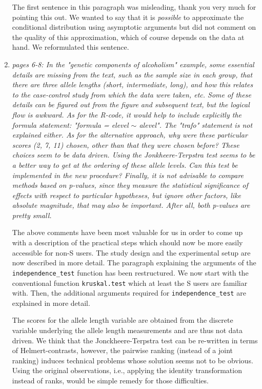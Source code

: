 \documentclass[11pt]{article}
\begin{document}
\begin{enumerate}
The first sentence in this paragraph was misleading, thank you very much for
pointing this out. We wanted to say that it is \textit{possible} to
approximate the conditional distribution using asymptotic arguments but did
not comment on the quality of this approximation, which of course depends on
the data at hand. We reformulated this sentence.

\item \textsl{pages 6-8:  In the "genetic components of alcoholism" example, some essential details are 
              missing from the text, such as the sample size in each group, that there are three allele 
              lengths (short, intermediate, long), and how this relates to the case-control study from 
              which the data were taken, etc. Some of these details can be figured out from the figure 
              and subsequent text, but the logical flow is awkward.  As for the R-code, it would help 
              to include explicitly the formula statement: "formula = elevel $\sim$ alevel". The "trafo" 
              statement is not explained either.  As for the alternative approach, why were these 
              particular scores (2, 7, 11) chosen, other than that they were chosen before? 
              These choices seem to be data driven. 
              Using the Jonkheere-Terpstra test seems to be a better way to get at the ordering of 
              these allele levels. Can this test be implemented in the new procedure? 
              Finally, it is not advisable to compare methods based on p-values, since they measure 
              the statistical significance of effects with respect to particular hypotheses, but 
              ignore other factors, like absolute magnitude, that may also be important. After all, 
              both p-values are pretty small.}

The above comments have been most valuable for us in order to come up with
a description of the practical steps which should now be more easily
accessible for non-\textsf{S}
users. The study design and the experimental setup are now described in more
detail. The paragraph explaining the arguments of the
\texttt{independence\_test} function has been restructured. We now start with the 
conventional function \texttt{kruskal.test} which at least the \textsf{S} users
are familiar with. Then, the additional arguments required for \texttt{independence\_test}
are explained in more detail.

The scores for the allele length variable are
obtained from the discrete variable underlying the allele length measurements
and are thus not data driven. We think that the Jonckheere-Terpstra test 
can be re-written in terms of Helmert-contrasts, however, the pairwise ranking (instead of a
joint ranking) induces technical problems whose solution seems not to be
obvious. Using the original observations, i.e., applying the 
identity transformation instead of ranks, would be simple remedy for those
difficulties.


\end{enumerate}
\end{document}

